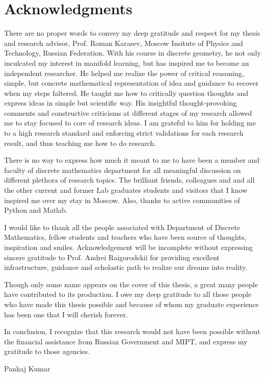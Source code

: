 \chapter*{Acknowledgments}

There are no proper words to convey my deep gratitude and respect for my thesis and research advisor, Prof. Roman Karasev, Moscow Insitute of Physics and Technology, Russian Federation. With his course in discrete geometry, he not only inculcated my interest in manifold learning, but has inspired me to become an independent researcher. He helped me realize the power of critical reasoning, simple, but concrete mathematical representation of idea and guidance to recover when my steps faltered. He taught me how to critically question thoughts and express ideas in simple but scientific way. His insightful thought-provoking comments and constructive criticisms at different stages of my research allowed me to stay focused to core of research ideas. I am grateful to him for holding me to a high research standard and enforcing strict validations for each research result, and thus teaching me how to do research.


There is no way to express how much it meant to me to have been a member and faculty of discrete mathematics department for all meaningful discussion on different plethora  of research topics. The brilliant friends, colleagues and and all the other current and former Lab graduates students and visitors that I know inspired me over my stay in Moscow. Also, thanks to active communities of Python and Matlab.

I would like to thank all the people associated with Department of Discrete Mathematics, fellow students and teachers who have been source of thoughts, inspiration and smiles. Acknowledgement will be incomplete without expressing sincere gratitude to Prof. Andrei Raigorodskii for providing excellent infrastructure, guidance and scholastic path to realize our dreams into reality.

Though only some name appears on the cover of this thesis, a great many people have contributed to its production. I owe my deep gratitude to all those people who have made this thesis possible and because of whom my graduate experience has been one that I will cherish forever. 

In conclusion, I recognize that this research would not have been possible without the financial assistance from Russian Government and MIPT, and express my gratitude to those agencies.
   
\begin{flushright}
Pankaj Kumar
\end{flushright}



